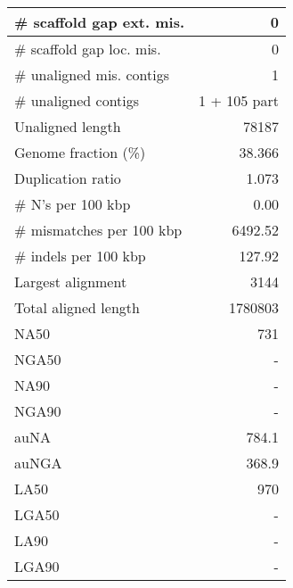 \documentclass[12pt,a4paper]{article}
\begin{document}
\begin{table}[ht]
\begin{center}
\begin{tabular}{|l*{1}{|r}|}
\# scaffold gap ext. mis. & 0 \\ \hline
\# scaffold gap loc. mis. & 0 \\ \hline
\# unaligned mis. contigs & 1 \\ \hline
\# unaligned contigs & 1 + 105 part \\ \hline
Unaligned length & 78187 \\ \hline
Genome fraction (\%) & 38.366 \\ \hline
Duplication ratio & 1.073 \\ \hline
\# N's per 100 kbp & 0.00 \\ \hline
\# mismatches per 100 kbp & 6492.52 \\ \hline
\# indels per 100 kbp & 127.92 \\ \hline
Largest alignment & 3144 \\ \hline
Total aligned length & 1780803 \\ \hline
NA50 & 731 \\ \hline
NGA50 & - \\ \hline
NA90 & - \\ \hline
NGA90 & - \\ \hline
auNA & 784.1 \\ \hline
auNGA & 368.9 \\ \hline
LA50 & 970 \\ \hline
LGA50 & - \\ \hline
LA90 & - \\ \hline
LGA90 & - \\ \hline
\end{tabular}
\end{center}
\end{table}
\end{document}
